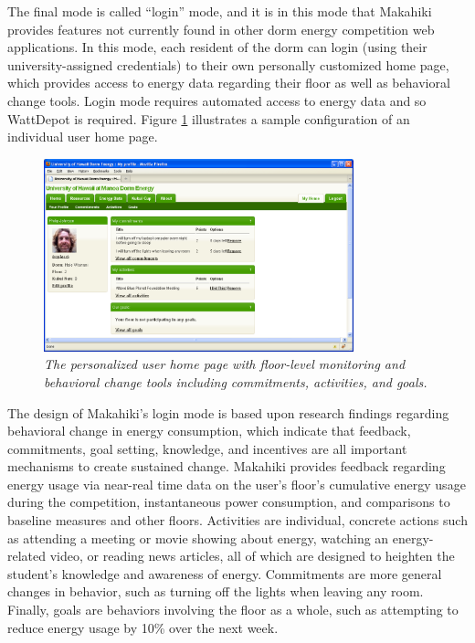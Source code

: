 The final mode is called ``login'' mode, and it is in this mode that
Makahiki provides features not currently found in other dorm energy
competition web applications.  In this mode, each resident of the dorm can
login (using their university-assigned credentials) to their own personally
customized home page, which provides access to energy data regarding their
floor as well as behavioral change tools. Login mode requires automated access
to energy data and so WattDepot is required.  Figure \ref{fig:makahiki-login}
illustrates a sample configuration of an individual user home page.

\begin{figure}[htbp]
  \center
  \includegraphics[width=0.8\textwidth]{makahiki.login.eps}
  \caption{\em \small The personalized user home page with floor-level monitoring and behavioral change tools 
including commitments, activities, and goals.}
  \label{fig:makahiki-login}
\end{figure} 

The design of Makahiki's login mode is based upon research findings
regarding behavioral change in energy consumption, which indicate that
feedback, commitments, goal setting, knowledge, and incentives are all
important mechanisms to create sustained change.  Makahiki provides
feedback regarding energy usage via near-real time data on the user's
floor's cumulative energy usage during the competition, instantaneous power
consumption, and comparisons to baseline measures and other
floors. Activities are individual, concrete actions such as attending a
meeting or movie showing about energy, watching an energy-related video, or
reading news articles, all of which are designed to heighten the student's
knowledge and awareness of energy. Commitments are more general changes in
behavior, such as turning off the lights when leaving any room.  Finally,
goals are behaviors involving the floor as a whole, such as attempting to
reduce energy usage by 10\% over the next week.  

